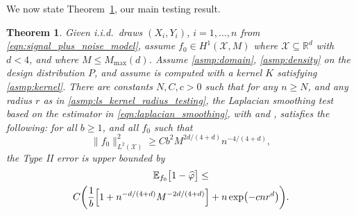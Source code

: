 \documentclass[twoside]{article}
\newcommand{\Reals}{\mathbb{R}}
\newcommand{\1}{\mathbf{1}}
\newcommand{\Rd}{\Reals^d}
\newcommand{\Xset}{\mathcal{X}}
\newcommand{\Leb}{L}
\newcommand{\Ebb}{\mathbb{E}}
\newcommand{\wh}[1]{\widehat{#1}}
\newtheorem{theorem}{Theorem}
\theoremstyle{definition}
\theoremstyle{remark}
\begin{document}
We now state Theorem~\ref{thm:laplacian_smoothing_testing}, our main testing result.
\begin{theorem}
	\label{thm:laplacian_smoothing_testing}
  Given i.i.d.\ draws $(X_i,Y_i)$, $i=1,\ldots,n$ from \eqref{eqn:signal_plus_noise_model}, assume $f_0 \in H^1(\Xset,M)$ where $\Xset \subseteq \Rd$ with $d < 4$, and where $M \leq M_{\max}(d)$. Assume \ref{asmp:domain}, \ref{asmp:density} on the design distribution $P$, and assume  is computed with a kernel $K$ satisfying \ref{asmp:kernel}. There are constants $N,C,c>0$ such that for any $n \geq N$, and any radius $r$ as in \ref{asmp:ls_kernel_radius_testing}, the Laplacian smoothing test \smash{$\wh{\varphi}$} based on the estimator \smash{$\wh{f}$} in \eqref{eqn:laplacian_smoothing}, with  and , satisfies the following: for all $b \geq 1$, and all $f_0$ such that
	\begin{equation}
	\label{eqn:laplacian_smoothing_testing}
	\bigl\|f_0\bigr\|_{\Leb^2(\Xset)}^2 \geq C b^2 M^{2d/(4 + d)} n^{-4/(4 + d)},
	\end{equation} 
	the Type II error is upper bounded by
	\begin{multline*}
	\Ebb_{f_0}\bigl[1 - \wh{\varphi} \bigr] \leq \\
	C\biggl(\frac{1}{b}\Bigl[1 + n^{-d/(4 + d)}M^{-2d/(4 + d)}\Bigr] + n\exp\bigl(-cnr^d\bigr)\biggr).
	\end{multline*}
\end{theorem}
\end{document}
